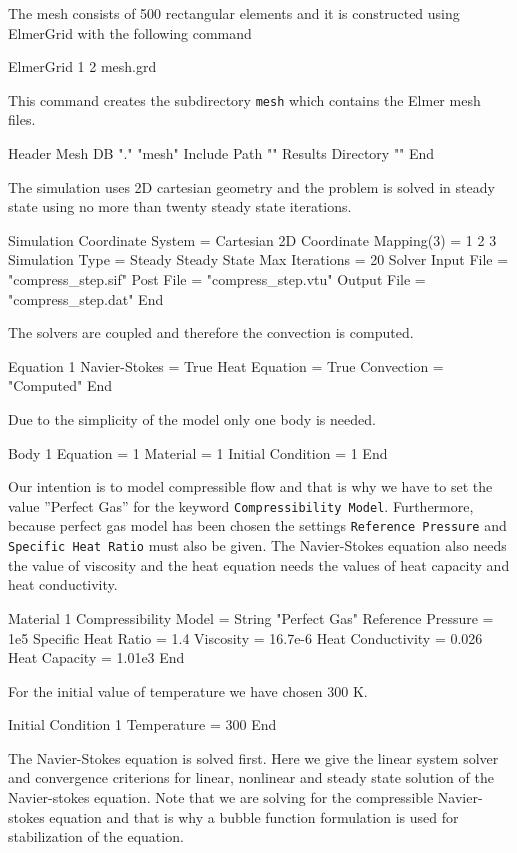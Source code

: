 \begin{flushleft}

The mesh consists of 500 rectangular elements and it is constructed using ElmerGrid with the following command

\ttbegin
ElmerGrid 1 2 mesh.grd
\ttend

This command creates the subdirectory {\tt mesh} which contains the Elmer mesh files.

\ttbegin
Header
  Mesh DB "." "mesh"
  Include Path ""
  Results Directory ""
End
\ttend

The simulation uses 2D cartesian geometry and the problem is solved in steady state using no more than twenty steady state iterations.

\ttbegin
Simulation
  Coordinate System =  Cartesian 2D
  Coordinate Mapping(3) = 1 2 3
  Simulation Type = Steady
  Steady State Max Iterations = 20
  Solver Input File = "compress_step.sif"
  Post File = "compress_step.vtu"
  Output File = "compress_step.dat"
End
\ttend

The solvers are coupled and therefore the convection is computed. 

\ttbegin
Equation 1
  Navier-Stokes = True
  Heat Equation = True
  Convection = "Computed"
End
\ttend

Due to the simplicity of the model only one body is needed.

\ttbegin
Body 1
  Equation = 1
  Material = 1
  Initial Condition = 1
End
\ttend

Our intention is to model compressible flow and that is why we have to set the value ''Perfect Gas'' for the keyword {\tt Compressibility Model}. Furthermore, because perfect gas model has been chosen the settings {\tt Reference Pressure} and {\tt Specific Heat Ratio} must also be given. The Navier-Stokes equation also needs the value of viscosity and the heat equation needs the values of heat capacity and heat conductivity.

\ttbegin
Material 1
  Compressibility Model = String "Perfect Gas"
  Reference Pressure = 1e5
  Specific Heat Ratio = 1.4
  Viscosity = 16.7e-6
  Heat Conductivity = 0.026
  Heat Capacity = 1.01e3
End
\ttend

For the initial value of temperature we have chosen 300 K.

\ttbegin
Initial Condition 1
  Temperature = 300
End
\ttend

The Navier-Stokes equation is solved first. Here we give the linear system solver and convergence criterions for linear, nonlinear and steady state solution of the Navier-stokes equation. Note that we are solving for the compressible Navier-stokes equation and that is why a bubble function formulation is used for stabilization of the equation.



\end{flushleft}
